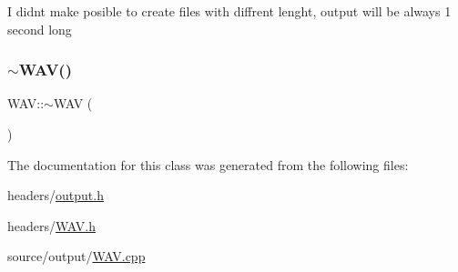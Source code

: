 I didn\textquotesingle{}t make posible to create files with diffrent lenght, output will be always 1 second long \mbox{\label{class_w_a_v_abf955e178e2e6682dbcf99b1f94db7a2}} 
\subsubsection{\texorpdfstring{$\sim$\+W\+A\+V()}{~WAV()}}
{\footnotesize\ttfamily W\+A\+V\+::$\sim$\+W\+AV (\begin{DoxyParamCaption}{ }\end{DoxyParamCaption})}



The documentation for this class was generated from the following files\+:\begin{DoxyCompactItemize}
\item 
headers/\hyperlink{output_8h}{output.\+h}\item 
headers/\hyperlink{_w_a_v_8h}{W\+A\+V.\+h}\item 
source/output/\hyperlink{_w_a_v_8cpp}{W\+A\+V.\+cpp}\end{DoxyCompactItemize}
